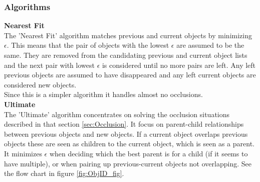 \subsubsection{Algorithms}
\textbf{Nearest Fit} \\
The 'Nearest Fit' algorithm matches previous and current objects by minimizing $\epsilon$. This means that the pair of objects with the lowest $\epsilon$ are assumed to be the same. They are removed from the candidating previous and current object lists and the next pair with lowest $\epsilon$ is considered until no more pairs are left. Any left previous objects are assumed to have disappeared and any left current objects are considered new objects. \\
Since this is a simpler algorithm it handles almost no occlusions. \\
\newline
\textbf{Ultimate}\\
The 'Ultimate' algorithm concentrates on solving the occlusion situations described in that section \ref{sec:Occlusion}. It focus on parent-child relationships between previous objects and new objects. If a current object overlaps previous objects these are seen as children to the current object, which is seen as a parent. It minimizes $\epsilon$ when deciding which the best parent is for a child (if it seems to have multiple), or when pairing up previous-current objects not overlapping. See the flow chart in figure \ref{fig:ObjID_fig}. \\
\newline

